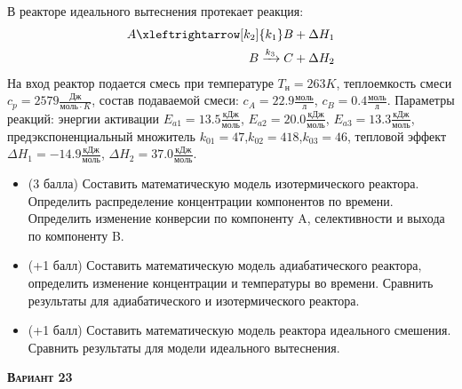  В реакторе идеального вытеснения протекает реакция: \begin{equation*} \begin{aligned} A \xleftrightarrow[k_2]{k_1} B + \Delta H_1 \\ B \xrightarrow{k_3} C + \Delta H_2 \end{aligned} \end{equation*}                                      На вход  реактор подается смесь при температуре $ T_н =  263 K$, теплоемкость смеси $c_p= 2579 \frac{Дж}{моль \cdot K}$, состав подаваемой смеси: $c_A=22.9 \frac{моль}{л}$, $c_B=0.4 \frac{моль}{л}$. Параметры реакций: энергии активации $E_{a1}=13.5 \frac{кДж}{моль}$, $E_{a2}=20.0  \frac{кДж}{моль}$, $E_{a3}=13.3  \frac{кДж}{моль}$, предэкспоненциальный множитель $k_{01}=        47$,$k_{02}=       418$,$k_{03}=        46$, тепловой эффект $\Delta H_1= -14.9  \frac{кДж}{моль}$, $\Delta H_2=37.0 \frac{кДж}{моль}$.\begin{itemize} \item (3 балла) Составить математическую модель изотермического реактора. Определить распределение концентрации компонентов по времени. Определить изменение конверсии по компоненту A, селективности и выхода по компоненту B. \item (+1 балл) Составить математическую модель адиабатического реактора, определить изменение концентрации и температуры во времени. Сравнить результаты для адиабатического и изотермического реактора. \item (+1 балл) Составить математическую модель реактора идеального смешения. Сравнить результаты для модели идеального вытеснения. \end{itemize}

\textsc{\textbf{Вариант 23}}

